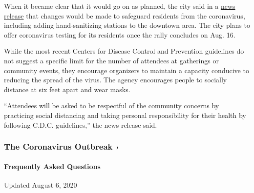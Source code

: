 When it became clear that it would go on as planned, the city said in a
\href{https://www.sturgis-sd.gov/media/Departments/Rally\%20\&\%20Events/2020\%20Sturgis\%20Motorcycle\%20Rally\%20Decision\%20pdf.pdf}{news
release} that changes would be made to safeguard residents from the
coronavirus, including adding hand-sanitizing stations to the downtown
area. The city plans to offer coronavirus testing for its residents once
the rally concludes on Aug. 16.

While the most recent Centers for Disease Control and Prevention
guidelines do not suggest a specific limit for the number of attendees
at gatherings or community events, they encourage organizers to maintain
a capacity conducive to reducing the spread of the virus. The agency
encourages people to socially distance at six feet apart and wear masks.

``Attendees will be asked to be respectful of the community concerns by
practicing social distancing and taking personal responsibility for
their health by following C.D.C. guidelines,'' the news release said.

\href{https://www.nytimes.com/news-event/coronavirus?action=click\&pgtype=Article\&state=default\&region=MAIN_CONTENT_3\&context=storylines_faq}{}

\hypertarget{the-coronavirus-outbreak-}{%
\subsubsection{The Coronavirus Outbreak
›}\label{the-coronavirus-outbreak-}}

\hypertarget{frequently-asked-questions}{%
\paragraph{Frequently Asked
Questions}\label{frequently-asked-questions}}

Updated August 6, 2020

